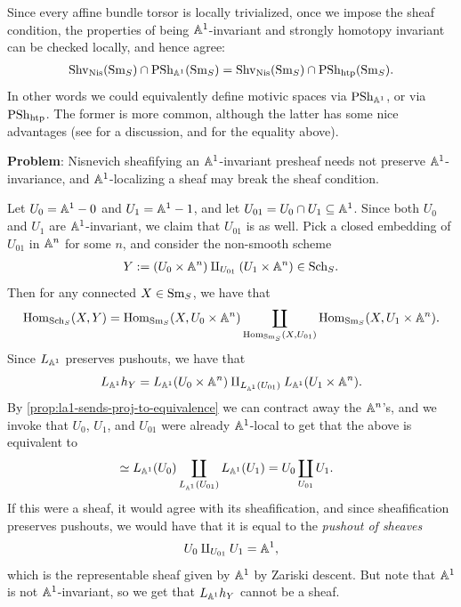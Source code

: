\documentclass[11pt,openany]{book}
\renewcommand{\Pre}{\mathrm{PSh}}
\begin{document}
\begin{remark} Since every affine bundle torsor is locally trivialized, once we impose the sheaf condition, the properties of being $\mathbb{A}^1$-invariant and strongly homotopy invariant can be checked locally, and hence agree:
\begin{align*}
    \mathrm{Shv}_{\mathrm{Nis}}(\mathrm{Sm}_S) \cap \mathrm{PSh}_{\mathbb{A}^1}(\mathrm{Sm}_S) = \mathrm{Shv}_{\mathrm{Nis}}(\mathrm{Sm}_S) \cap \mathrm{PSh}_{\mathrm{htp}}(\mathrm{Sm}_S).
\end{align*}
In other words we could equivalently define motivic spaces via $\Pre_{\A^1}$, or via $\Pre_\htp$. The former is more common, although the latter has some nice advantages (see \cite[p.~204]{Hoyois6} for a discussion, and \cite[3.13]{Hoyois6} for the equality above).
\end{remark}


 
\textbf{Problem}: Nisnevich sheafifying an $\mathbb{A}^1$-invariant presheaf needs not preserve $\mathbb{A}^1$-invariance, and $\mathbb{A}^1$-localizing a sheaf may break the sheaf condition. 

\begin{example} \cite[3.2.7]{MV} Let $U_0 = \mathbb{A}^1-0$ and $U_1 = \mathbb{A}^1-1$, and let $U_{01} = U_0 \cap U_1 \subseteq \mathbb{A}^1$. Since both $U_0$ and $U_1$ are $\mathbb{A}^1$-invariant, we claim that $U_{01}$ is as well. Pick a closed embedding of $U_{01}$ in $\mathbb{A}^n$ for some $n$, and consider the non-smooth scheme
\begin{align*}
    Y:=(U_0 \times \mathbb{A}^n) \amalg_{U_{01}} (U_1 \times \mathbb{A}^n) \in \mathrm{Sch}_S.
\end{align*}
Then for any connected $X\in \mathrm{Sm}_S$, we have that
\begin{align*}
    \mathrm{Hom}_{\mathrm{Sch}_S}(X,Y) = \mathrm{Hom}_{\mathrm{Sm}_S}(X, U_0 \times \mathbb{A}^n) \coprod_{\mathrm{Hom}_{\mathrm{Sm}_S}(X,U_{01})} \mathrm{Hom}_{\mathrm{Sm}_S}(X, U_1 \times \mathbb{A}^n).
\end{align*}
%
Since $L_{\mathbb{A}^1}$ preserves pushouts, we have that
\begin{align*}
    L_{\mathbb{A}^1} h_Y = L_{\mathbb{A}^1}(U_0 \times\mathbb{A}^n) \amalg_{L_{\mathbb{A}^1}(U_{01})} L_{\mathbb{A}^1}(U_1 \times \mathbb{A}^n).
\end{align*}
By \autoref{prop:la1-sends-proj-to-equivalence} we can contract away the $\mathbb{A}^n$'s, and we invoke that $U_0$, $U_1$, and $U_{01}$ were already $\mathbb{A}^1$-local to get that the above is equivalent to
\begin{align*}
    &\simeq L_{\mathbb{A}^1}(U_0) \coprod_{L_{\mathbb{A}^1}(U_{01})} L_{\mathbb{A}^1}(U_1) = U_0 \coprod_{U_{01}} U_1.
\end{align*}
If this were a sheaf, it would agree with its sheafification, and since sheafification preserves pushouts, we would have that it is equal to the \textit{pushout of sheaves}
\begin{align*}
    U_0 \amalg_{U_{01}} U_1 = \mathbb{A}^1,
\end{align*}
which is the representable sheaf given by $\mathbb{A}^1$ by Zariski descent. But note that $\mathbb{A}^1$ is not $\mathbb{A}^1$-invariant, so we get that $L_{\mathbb{A}^1}h_Y$ cannot be a sheaf.
\end{example}
\end{document}

